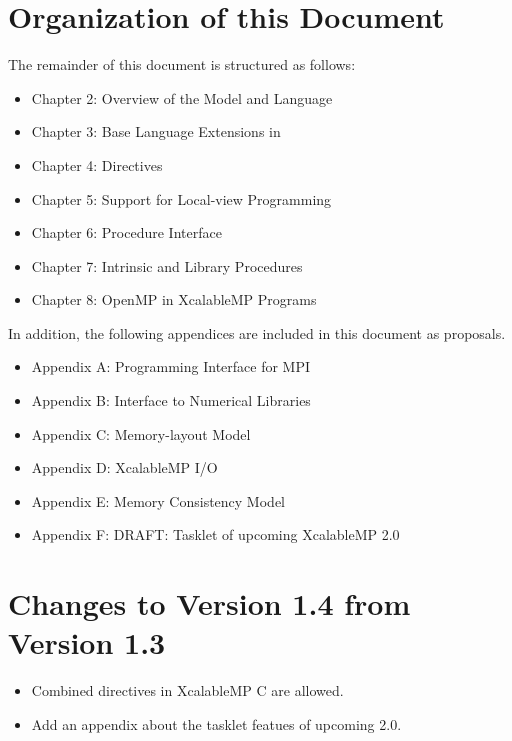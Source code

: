 \section{Organization of this Document}

The remainder of this document is structured as follows:

\begin{itemize}
 \item Chapter 2: Overview of the {\XMP} Model and Language
 \item Chapter 3: Base Language Extensions in {\XMPC}
 \item Chapter 4: Directives 
 \item Chapter 5: Support for Local-view Programming
 \item Chapter 6: Procedure Interface
 \item Chapter 7: Intrinsic and Library Procedures
 \item Chapter 8: OpenMP in XcalableMP Programs
\end{itemize}
%
In addition, the following appendices are included in this document as
proposals.
%
\begin{itemize}
 \item Appendix A: Programming Interface for MPI
 \item Appendix B: Interface to Numerical Libraries
 \item Appendix C: Memory-layout Model
 \item Appendix D: XcalableMP I/O
 \item Appendix E: Memory Consistency Model
 \item Appendix F: DRAFT: Tasklet of upcoming XcalableMP 2.0
\end{itemize}

\section{Changes to Version 1.4 from Version 1.3}
\begin{itemize}
  \item Combined directives in XcalableMP C are allowed.
  \item Add an appendix about the tasklet featues of upcoming {\XMP} 2.0.
\end{itemize}


